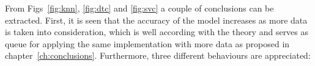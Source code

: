 
From Figs~\ref{fig:knn}, \ref{fig:dtc} and \ref{fig:svc} a couple of conclusions can be extracted. First, it is seen that the accuracy of the model increases as more data is taken into consideration, which is well according with the theory and serves as queue for applying the same implementation with more data as proposed in chapter~\ref{ch:conclusions}. Furthermore, three different behaviours are appreciated:

